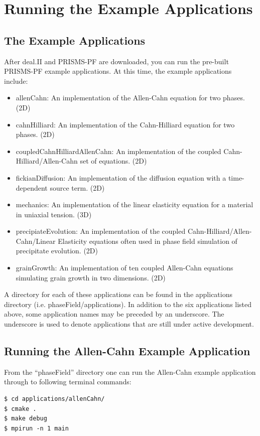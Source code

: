 \documentclass[10pt]{article} %
\begin{document}
\section{Running the Example Applications}
\subsection{The Example Applications}
After deal.II and PRISMS-PF are downloaded, you can run the pre-built PRISMS-PF example applications. At this time, the example applications include:
\begin{itemize}
\item allenCahn: An implementation of the Allen-Cahn equation for two phases. (2D)
\item cahnHilliard: An implementation of the Cahn-Hilliard equation for two phases. (2D)
\item coupledCahnHilliardAllenCahn: An implementation of the coupled Cahn-Hilliard/Allen-Cahn set of equations. (2D)
\item fickianDiffusion: An implementation of the diffusion equation with a time-dependent source term. (2D)
\item mechanics: An implementation of the linear elasticity equation for a material in uniaxial tension. (3D)
\item precipiateEvolution: An implementation of the coupled Cahn-Hilliard/Allen-Cahn/Linear Elasticity equations often used in phase field simulation of precipitate evolution. (2D)
\item grainGrowth: An implementation of ten coupled Allen-Cahn equations simulating grain growth in two dimensions. (2D)
\end{itemize}

A directory for each of these applications can be found in the applications directory (i.e. phaseField/applications). In addition to the six applications listed above, some application names may be preceded by an underscore. The underscore is used to denote applications that are still under active development.

\subsection{Running the Allen-Cahn Example Application} \label{allen_cahn_instructions}
From the ``phaseField'' directory one can run the Allen-Cahn example application through to following terminal commands:
\begin{lstlisting}
$ cd applications/allenCahn/ 
$ cmake . 
$ make debug 
$ mpirun -n 1 main 
\end{lstlisting}
\end{document}
